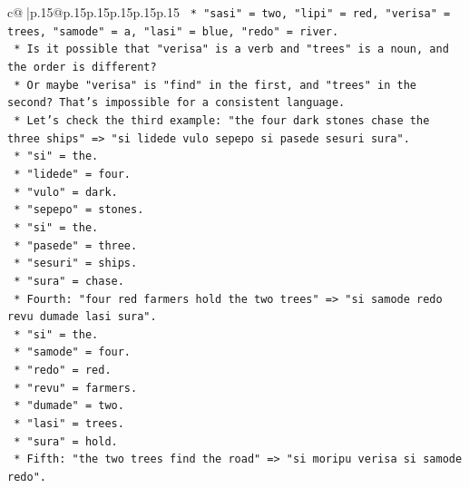 \documentclass{article}
\begin{document}
{\begin{supertabular}{c@{$\;$}|p{.15\linewidth}@{}p{.15\linewidth}p{.15\linewidth}p{.15\linewidth}p{.15\linewidth}p{.15\linewidth}}
{{{\texttt{                                    *   "sasi" = two, "lipi" = red, "verisa" = trees, "samode" = a, "lasi" = blue, "redo" = river.} \\
\texttt{                                *   Is it possible that "verisa" is a verb and "trees" is a noun, and the order is different?} \\
\texttt{                                *   Or maybe "verisa" is "find" in the first, and "trees" in the second? That's impossible for a consistent language.} \\
\texttt{                                *   Let's check the third example: "the four dark stones chase the three ships" => "si lidede vulo sepepo si pasede sesuri sura".} \\
\texttt{                                    *   "si" = the.} \\
\texttt{                                    *   "lidede" = four.} \\
\texttt{                                    *   "vulo" = dark.} \\
\texttt{                                    *   "sepepo" = stones.} \\
\texttt{                                    *   "si" = the.} \\
\texttt{                                    *   "pasede" = three.} \\
\texttt{                                    *   "sesuri" = ships.} \\
\texttt{                                    *   "sura" = chase.} \\
\texttt{                                *   Fourth: "four red farmers hold the two trees" => "si samode redo revu dumade lasi sura".} \\
\texttt{                                    *   "si" = the.} \\
\texttt{                                    *   "samode" = four.} \\
\texttt{                                    *   "redo" = red.} \\
\texttt{                                    *   "revu" = farmers.} \\
\texttt{                                    *   "dumade" = two.} \\
\texttt{                                    *   "lasi" = trees.} \\
\texttt{                                    *   "sura" = hold.} \\
\texttt{                                *   Fifth: "the two trees find the road" => "si moripu verisa si samode redo".} \\
}}}
\end{supertabular}}
\end{document}
